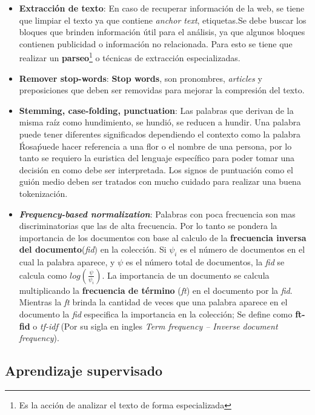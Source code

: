 \begin{itemize}

	\item \textbf{Extracción de texto}: En caso de recuperar información de la web, se tiene que limpiar el texto ya que contiene \textit{anchor text}, etiquetas.Se debe buscar los bloques que brinden información útil para el análisis, ya que algunos bloques contienen publicidad o información no relacionada. Para esto se tiene que realizar un \textbf{parseo}\footnote{Es la acción de analizar el texto de forma especializada} o técnicas de extracción especializadas.

	\item \textbf{Remover stop-words}: \textbf{Stop words}, son pronombres, \textit{articles} y preposiciones que deben ser removidas para mejorar la compresión del texto.

	\item  \textbf{Stemming, case-folding, punctuation}: Las palabras que derivan de la misma raíz como hundimiento, se hundió, se reducen a hundir. Una palabra puede tener diferentes significados dependiendo el contexto como la palabra \'Rosa\' puede hacer referencia a una flor o el nombre de una persona, por lo tanto se requiero la euristica del lenguaje específico para poder tomar una decisión en como debe ser interpretada. Los signos de puntuación como el guión medio deben ser tratados con mucho cuidado para realizar una buena tokenización.

	\item \textbf{\textit{Frequency-based normalization}}: Palabras con poca frecuencia son mas discriminatorias que las de alta frecuencia. Por lo tanto se pondera la importancia de los documentos con base al calculo de la \textbf{frecuencia inversa del documento}(\textit{fid}) en la colección. Si $\psi_i$ es el número de documentos en el cual la palabra aparece, y $\psi$ es el número total de documentos, la \textit{fid} se calcula como $log(\frac{\psi}{\psi_i})$. La importancia de un documento se calcula multiplicando la \textbf{frecuencia de término} (\textit{ft}) en el documento por la \textit{fid}. Mientras la \textit{ft} brinda la cantidad de veces  que una palabra aparece en el documento la \textit{fid} especifica la importancia en la colección; Se define como \textbf{ft-fid} o \textit{tf-idf} (Por su sigla en ingles \textit{Term frequency – Inverse document frequency}).

\end{itemize}


\subsection{Aprendizaje supervisado}

